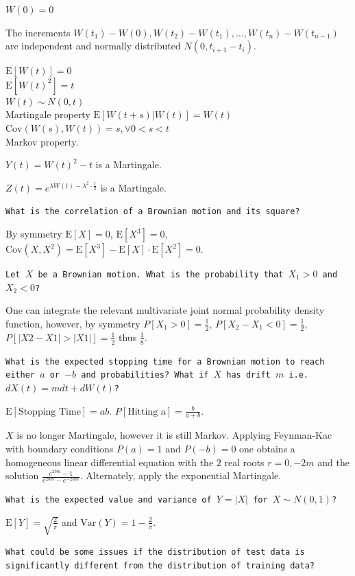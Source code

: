 $W(0)=0$

The increments $W(t_1)-W(0), W(t_2)-W(t_1),\dots, W(t_n)-W(t_{n-1})$ are independent and normally distributed $N(0,t_{i+1}-t_i)$.

$\text{E}[W(t)] = 0$ \\
$\text{E}[W(t)^2] = t$ \\
$W(t) \sim N(0, t)$ \\
Martingale property $\text{E}[W(t + s)|W(t)] = W(t)$ \\
$\text{Cov}(W(s), W(t)) = s, \forall 0 < s < t$ \\
Markov property.

$Y(t) = W(t)^2 - t$ is a Martingale.

$Z(t) = e^{\lambda W(t) - \lambda^2 \cdot \frac{t}{2}}$ is a Martingale.

\texttt{What is the correlation of a Brownian motion and its square?}

By symmetry $\text{E}[X] = 0$, $\text{E}[X^3] = 0$, $\text{Cov}(X,X^2) = \text{E}[X^3]-\text{E}[X] \cdot \text{E}[X^2] = \boxed{0}$.

\texttt{Let $X$ be a Brownian motion. What is the probability that $X_1>0$ and $X_2<0$?}

One can integrate the relevant multivariate joint normal probability density function, however, by symmetry $P[X_1>0]=\frac{1}{2}$, $P[X_2-X_1<0]=\frac{1}{2}$, $P[|X2-X1|>|X1|]=\frac{1}{2}$ thus $\boxed{\frac{1}{8}}$.

\texttt{What is the expected stopping time for a Brownian motion to reach either $a$ or $-b$ and probabilities? What if $X$ has drift $m$ i.e. $dX(t)=m dt+d W(t)$?}

$\text{E}[\text{Stopping Time}]=\boxed{ab}$. $P[\text{Hitting a}]=\boxed{\frac{b}{a+b}}$.

$X$ is no longer Martingale, however it is still Markov. Applying Feynman-Kac with boundary conditions $P(a)=1$ and $P(-b)=0$ one obtains a homogeneous linear differential equation with the $2$ real roots $r = 0,-2m$ and the solution $\boxed{\frac{e^{2bm}-1}{e^{2bm}-e^{-2am}}}$. Alternately, apply the exponential Martingale.

\texttt{What is the expected value and variance of $Y=|X|$ for $X \sim N(0,1)$?}

$\text{E}[Y]=\boxed{\sqrt{\frac{2}{\pi}}}$ and $\text{Var}(Y)=\boxed{1-\frac{2}{\pi}}$.

\texttt{What could be some issues if the distribution of test data is significantly different from the distribution of training data?}

